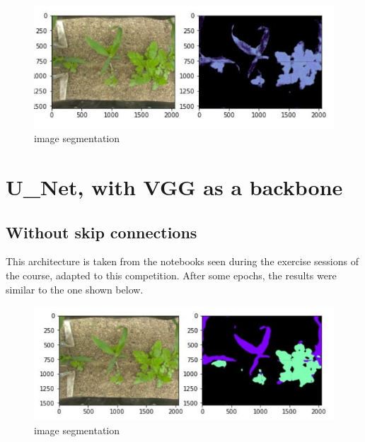 \documentclass[12pt,a4paper]{report}
\begin{document}
\begin{figure}[H]
	\includegraphics[scale = 1.2, center]{MobileNetV2}
	\caption{image segmentation}
\end{figure}

		\section{U\_Net, with VGG as a backbone}
	\subsection{Without skip connections}
This architecture is taken from the notebooks seen during the exercise sessions of the course, adapted to this competition.
After some epochs, the results were similar to the one shown below.

\begin{figure}[H]
	\includegraphics[scale = .75, center]{vgg_upsampling_without}
	\caption{image segmentation}
\end{figure}
\end{document}
